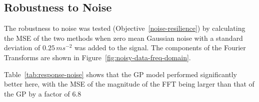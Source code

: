\documentclass[12pt]{article}
\begin{document}
    \subsection{Robustness to Noise}
    The robustness to noise was tested (Objective~\ref{noise-resilience}) by calculating the MSE of the two methods when zero mean Gaussian noise with a standard deviation of $0.25 \, ms^{-2}$ was added to the signal.
    The components of the Fourier Transforms are shown in Figure~\ref{fig:noisy-data-freq-domain}.


    Table~\ref{tab:response-noise} shows that the GP model performed significantly better here, with the MSE of the magnitude of the FFT being larger than that of the GP by a factor of 6.8
\end{document}
